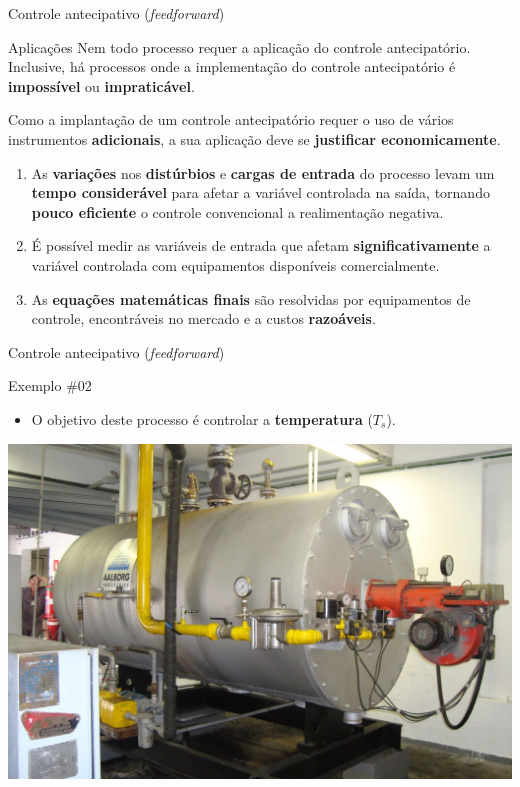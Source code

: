 \begin{frame}{Controle antecipativo (\textit{feedforward})}
	\begin{block}{Aplicações}
		Nem todo processo requer a aplicação do	controle antecipatório. Inclusive, há processos onde a implementação do controle antecipatório é \textbf{impossível} ou \textbf{impraticável}.
		
		\medskip
		
		Como a implantação de um controle antecipatório requer o uso de vários instrumentos \textbf{adicionais}, a sua aplicação deve se \textbf{justificar economicamente}.
		
		\begin{enumerate}
			\item As \textbf{variações} nos \textbf{distúrbios} e \textbf{cargas de entrada} do processo levam um \textbf{tempo considerável} para afetar a variável controlada na saída, tornando \textbf{pouco eficiente} o controle convencional a realimentação negativa.
			\item É possível medir as variáveis de entrada que afetam \textbf{significativamente} a variável controlada com equipamentos disponíveis comercialmente.
			\item As \textbf{equações matemáticas finais} são resolvidas por equipamentos de controle, encontráveis no mercado e a custos \textbf{razoáveis}.
		\end{enumerate}
	\end{block}
\end{frame}


\begin{frame}{Controle antecipativo (\textit{feedforward})}
	\begin{block}{Exemplo \#02}
		\begin{itemize}
			\item O objetivo deste processo é controlar a \textbf{temperatura} ($ T_s $).
		\end{itemize}
	\end{block}

	\centering
	\includegraphics[width=0.7\linewidth]{Figuras/Ch15/fig3}

\end{frame}


